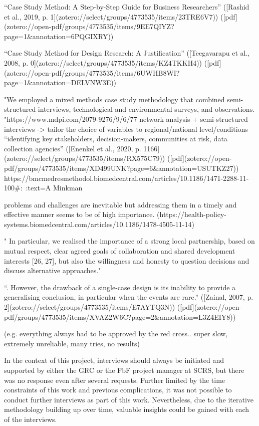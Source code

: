 “Case Study Method: A Step-by-Step Guide for Business Researchers” ([Rashid et al., 2019, p. 1](zotero://select/groups/4773535/items/23TRE6V7)) ([pdf](zotero://open-pdf/groups/4773535/items/9EE7QIYZ?page=1&annotation=6PQGIXRY))

“Case Study Method for Design Research: A Justification” ([Teegavarapu et al., 2008, p. 0](zotero://select/groups/4773535/items/KZ4TKKH4)) ([pdf](zotero://open-pdf/groups/4773535/items/6UWHB8WI?page=1&annotation=DELVNW3E))

"We employed a mixed methods case study methodology that combined semi-structured interviews, technological and environmental surveys, and observations. "https://www.mdpi.com/2079-9276/9/6/77
network analysis + semi-structured interviews -> tailor the choice of variables to regional/national level/conditions “identifying key stakeholders, decision-makers, communities at risk, data collection agencies” ([Enenkel et al., 2020, p. 1166](zotero://select/groups/4773535/items/RX575C79)) ([pdf](zotero://open-pdf/groups/4773535/items/XD499UNK?page=6&annotation=USUTKZ27))
https://bmcmedresmethodol.biomedcentral.com/articles/10.1186/1471-2288-11-100#:~:text=A%
Minkman




problems and challenges are inevitable but addressing them in a timely and effective manner seems to be of high importance. (https://health-policy-systems.biomedcentral.com/articles/10.1186/1478-4505-11-14)


" In particular, we realised the importance of a strong local partnership, based on mutual respect, clear agreed goals of collaboration and shared development interests [26, 27], but also the willingness and honesty to question decisions and discuss alternative approaches."



“. However, the drawback of a single-case design is its inability to provide a generalising conclusion, in particular when the events are rare.” ([Zainal, 2007, p. 2](zotero://select/groups/4773535/items/E7AYTQ3N)) ([pdf](zotero://open-pdf/groups/4773535/items/XVAZ2W6C?page=2&annotation=L3Z4EIY8))

(e.g. everything always had to be approved by the red cross.. super slow, extremely unreliable, many tries, no results)

In the context of this project, interviews should always be initiated and supported by either the GRC or the FbF project manager at SCRS, but there was no response even after several requests. Further limited by the time constraints of this work and previous complications, it was not possible to conduct further interviews as part of this work. Nevertheless, due to the iterative methodology building up over time, valuable insights could be gained with each of the interviews. 

